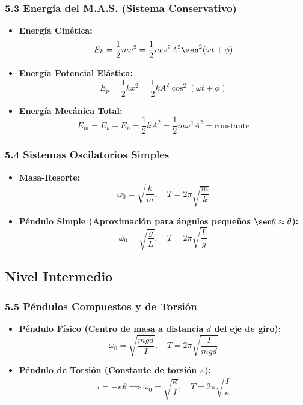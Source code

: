 \documentclass[11pt,a4paper]{article}
\begin{document}
\subsubsection*{5.3 Energía del M.A.S. (Sistema Conservativo)}

\begin{itemize}
  \item \textbf{Energía Cinética:}
  \[
    E_k = \frac{1}{2} m v^2 = \frac{1}{2} m \omega^2 A^2 \sen^2(\omega t + \phi)
  \]
  \item \textbf{Energía Potencial Elástica:}
  \[
    E_p = \frac{1}{2} k x^2 = \frac{1}{2} k A^2 \cos^2(\omega t + \phi)
  \]
  \item \textbf{Energía Mecánica Total:}
  \[
    E_m = E_k + E_p = \frac{1}{2} k A^2 = \frac{1}{2} m \omega^2 A^2 = \text{constante}
  \]
\end{itemize}

\subsubsection*{5.4 Sistemas Oscilatorios Simples}

\begin{itemize}
  \item \textbf{Masa-Resorte:}
  \[
    \omega_0 = \sqrt{\frac{k}{m}}, \quad T = 2\pi\sqrt{\frac{m}{k}}
  \]
  \item \textbf{Péndulo Simple (Aproximación para ángulos pequeños $\sen\theta \approx \theta$):}
  \[
    \omega_0 = \sqrt{\frac{g}{L}}, \quad T = 2\pi\sqrt{\frac{L}{g}}
  \]
\end{itemize}

\subsection*{Nivel Intermedio}

\subsubsection*{5.5 Péndulos Compuestos y de Torsión}

\begin{itemize}
  \item \textbf{Péndulo Físico (Centro de masa a distancia $d$ del eje de giro):}
  \[
    \omega_0 = \sqrt{\frac{m g d}{I}}, \quad T = 2\pi\sqrt{\frac{I}{m g d}}
  \]
  \item \textbf{Péndulo de Torsión (Constante de torsión $\kappa$):}
  \[
    \tau = -\kappa \theta \implies \omega_0 = \sqrt{\frac{\kappa}{I}}, \quad T = 2\pi\sqrt{\frac{I}{\kappa}}
  \]
\end{itemize}
\end{document}
